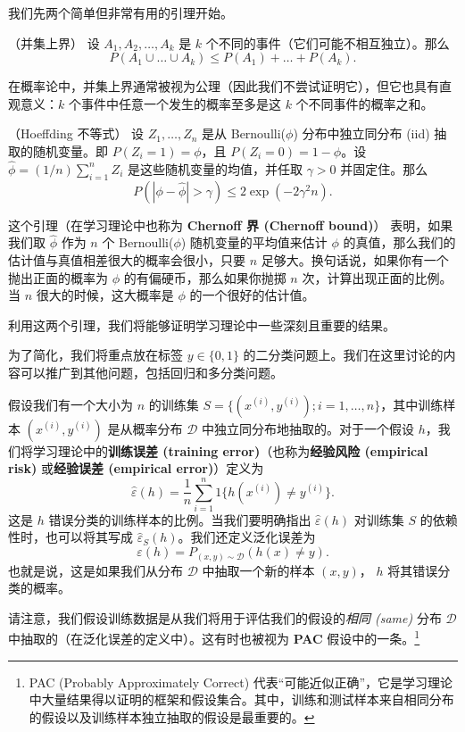 我们先两个简单但非常有用的引理开始。

\begin{lemma*}
    （并集上界）
    设 $A_1, A_2, \dots, A_k$ 是 $k$ 个不同的事件（它们可能不相互独立）。那么
    \[
        P(A_1 \cup \dots \cup A_k) \leq P(A_1) + \dots + P(A_k).
    \]
\end{lemma*}

在概率论中，并集上界通常被视为公理（因此我们不尝试证明它），但它也具有直观意义：$k$ 个事件中任意一个发生的概率至多是这 $k$ 个不同事件的概率之和。

\begin{lemma*}
    （Hoeffding 不等式）
    设 $Z_1, \dots, Z_n$ 是从 Bernoulli($\phi$) 分布中独立同分布 (iid) 抽取的随机变量。即 $P(Z_i = 1) = \phi$，且 $P(Z_i = 0) = 1 - \phi$。设 $\hat{\phi} = (1/n) \sum_{i=1}^n Z_i$ 是这些随机变量的均值，并任取 $\gamma > 0$ 并固定住。那么
    \[
        P(|\phi - \hat{\phi}| > \gamma) \leq 2\exp(-2\gamma^2 n).
    \]
\end{lemma*}

这个引理（在学习理论中也称为 \textbf{Chernoff 界 (Chernoff bound)}） 表明，如果我们取 $\hat{\phi}$ 作为 $n$ 个 Bernoulli($\phi$) 随机变量的平均值来估计 $\phi$ 的真值，那么我们的估计值与真值相差很大的概率会很小，只要 $n$ 足够大。换句话说，如果你有一个抛出正面的概率为 $\phi$ 的有偏硬币，那么如果你抛掷 $n$ 次，计算出现正面的比例。当 $n$ 很大的时候，这大概率是 $\phi$ 的一个很好的估计值。

利用这两个引理，我们将能够证明学习理论中一些深刻且重要的结果。

为了简化，我们将重点放在标签 $y \in \{0, 1\}$ 的二分类问题上。我们在这里讨论的内容可以推广到其他问题，包括回归和多分类问题。

假设我们有一个大小为 $n$ 的训练集 $S = \{(x^{(i)}, y^{(i)}); i = 1, \dots, n\}$，其中训练样本 $(x^{(i)}, y^{(i)})$ 是从概率分布 $\mathcal{D}$ 中独立同分布地抽取的。对于一个假设 $h$，我们将学习理论中的\textbf{训练误差 (training error)}（也称为\textbf{经验风险 (empirical risk)} 或\textbf{经验误差 (empirical error)}）定义为
\[
    \hat{\varepsilon}(h) = \frac{1}{n} \sum_{i=1}^n {1}\{h(x^{(i)}) \neq y^{(i)}\}.
\]
这是 $h$ 错误分类的训练样本的比例。当我们要明确指出 $\hat{\varepsilon}(h)$ 对训练集 $S$ 的依赖性时，也可以将其写成 $\hat{\varepsilon}_S(h)$。我们还定义泛化误差为
\[
    \varepsilon(h) = P_{(x,y) \sim \mathcal{D}}(h(x) \neq y).
\]
也就是说，这是如果我们从分布 $\mathcal{D}$ 中抽取一个新的样本 $(x, y)$， $h$ 将其错误分类的概率。

请注意，我们假设训练数据是从我们将用于评估我们的假设的\textit{相同 (same)} 分布 $\mathcal{D}$ 中抽取的（在泛化误差的定义中）。这有时也被视为 \textbf{PAC} 假设中的一条。\footnote{PAC (Probably Approximately Correct) 代表“可能近似正确”，它是学习理论中大量结果得以证明的框架和假设集合。其中，训练和测试样本来自相同分布的假设以及训练样本独立抽取的假设是最重要的。}


